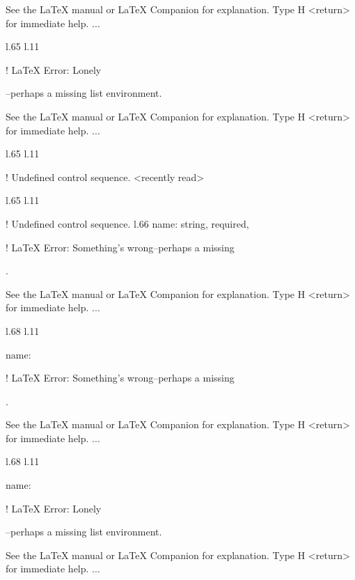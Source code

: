 {{{{{{{{{{See the LaTeX manual or LaTeX Companion for explanation.
Type  H <return>  for immediate help.
 ...                                              
                                                  
l.65 l.11       \item \xmlAttr
                              

! LaTeX Error: Lonely \item--perhaps a missing list environment.

See the LaTeX manual or LaTeX Companion for explanation.
Type  H <return>  for immediate help.
 ...                                              
                                                  
l.65 l.11       \item \xmlAttr
                              
! Undefined control sequence.
<recently read> \xmlAttr 
                         
l.65 l.11       \item \xmlAttr
                              
! Undefined control sequence.
l.66                          {name}: \xmlDesc
                                              {string, required},

! LaTeX Error: Something's wrong--perhaps a missing \item.

See the LaTeX manual or LaTeX Companion for explanation.
Type  H <return>  for immediate help.
 ...                                              
                                                  
l.68 l.11       \item \xmlAttr
                              {name}: \xmlDesc

! LaTeX Error: Something's wrong--perhaps a missing \item.

See the LaTeX manual or LaTeX Companion for explanation.
Type  H <return>  for immediate help.
 ...                                              
                                                  
l.68 l.11       \item \xmlAttr
                              {name}: \xmlDesc

! LaTeX Error: Lonely \item--perhaps a missing list environment.

See the LaTeX manual or LaTeX Companion for explanation.
Type  H <return>  for immediate help.
 ...                                              
                                                  
}}}}}}}}}}
